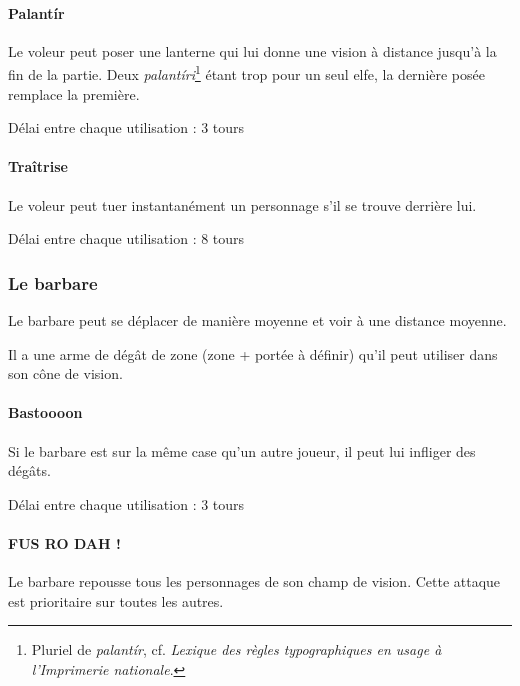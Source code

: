 \paragraph{Palantír} Le voleur peut poser une lanterne qui lui donne une vision à distance jusqu'à la fin de la partie. Deux \emph{palantíri}\footnote{Pluriel de \emph{palantír}, cf. \emph{Lexique des règles typographiques en usage à l’Imprimerie nationale}.} étant trop pour un seul elfe, la dernière posée remplace la première.

    Délai entre chaque utilisation : 3 tours

\paragraph{Traîtrise} Le voleur peut tuer instantanément un personnage s'il se trouve derrière lui.

    Délai entre chaque utilisation : 8 tours


\subsubsection{Le barbare}


Le barbare peut se déplacer de manière moyenne et voir à une distance moyenne.

Il a une arme de dégât de zone (zone + portée à définir) qu’il peut utiliser dans son cône de vision.

\paragraph{Bastoooon} Si le barbare est sur la même case qu’un autre joueur, il peut lui infliger des dégâts.

    Délai entre chaque utilisation : 3 tours

\paragraph{FUS RO DAH !} Le barbare repousse tous les personnages de son champ de vision. Cette attaque est prioritaire sur toutes les autres.

